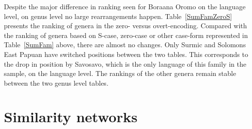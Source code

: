 Despite the major difference in ranking seen for Boraana Oromo on the language level, on genus level no large rearrangements happen.
Table~\ref{SumFamZeroS} presents the ranking of genera in the zero- versus overt-encoding.
Compared with the ranking of genera based on S-case, zero-case or other case-form represented in Table~\ref{SumFam} above, there are almost no changes.
Only Surmic and Solomons East Papuan have switched positions between the two tables. 
This corresponds to the drop in position by Savosavo, which is the only language of this family in the sample, on the language level. 
The rankings of the other genera remain stable between the two genus level tables.
  
\section{Similarity networks}\label{networkstyp}

